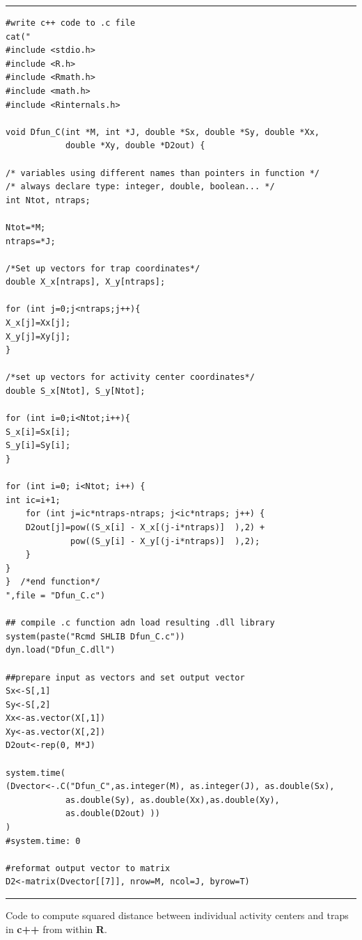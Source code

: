 \begin{panel}[ht]
\centering
\rule[0.15in]{\textwidth}{.03in}
{\small
\begin{verbatim}
#write c++ code to .c file
cat("
#include <stdio.h>
#include <R.h>
#include <Rmath.h>
#include <math.h>
#include <Rinternals.h>

void Dfun_C(int *M, int *J, double *Sx, double *Sy, double *Xx, 
			double *Xy, double *D2out) {  

/* variables using different names than pointers in function */
/* always declare type: integer, double, boolean... */
int Ntot, ntraps;

Ntot=*M;
ntraps=*J;

/*Set up vectors for trap coordinates*/
double X_x[ntraps], X_y[ntraps];

for (int j=0;j<ntraps;j++){
X_x[j]=Xx[j];
X_y[j]=Xy[j];
}

/*set up vectors for activity center coordinates*/
double S_x[Ntot], S_y[Ntot];

for (int i=0;i<Ntot;i++){
S_x[i]=Sx[i];
S_y[i]=Sy[i];
}

for (int i=0; i<Ntot; i++) {
int ic=i+1;
	for (int j=ic*ntraps-ntraps; j<ic*ntraps; j++) {
	D2out[j]=pow((S_x[i] - X_x[(j-i*ntraps)]  ),2) + 
			 pow((S_y[i] - X_y[(j-i*ntraps)]  ),2);
	}
}
}  /*end function*/
",file = "Dfun_C.c")

## compile .c function adn load resulting .dll library
system(paste("Rcmd SHLIB Dfun_C.c"))
dyn.load("Dfun_C.dll")

##prepare input as vectors and set output vector
Sx<-S[,1]
Sy<-S[,2]
Xx<-as.vector(X[,1])
Xy<-as.vector(X[,2])
D2out<-rep(0, M*J)

system.time(
(Dvector<-.C("Dfun_C",as.integer(M), as.integer(J), as.double(Sx), 
			as.double(Sy), as.double(Xx),as.double(Xy), 
			as.double(D2out) ))
)
#system.time: 0

#reformat output vector to matrix
D2<-matrix(Dvector[[7]], nrow=M, ncol=J, byrow=T)
\end{verbatim}
}
\rule[-0.15in]{\textwidth}{.03in}
\caption{
Code to compute squared distance between individual activity centers and traps in {\bf c++} from within {\bf R}.
}
\label{mcmc.panel.C1}
\end{panel}


